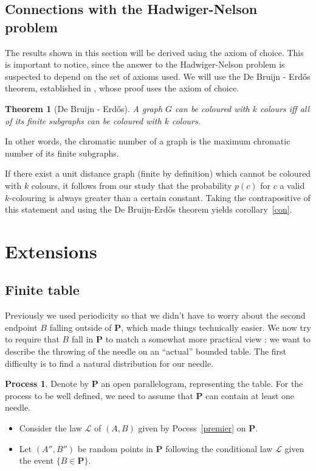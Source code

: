\documentclass[a4paper,11pt]{article}
\newtheorem{theo}{Theorem}
\theoremstyle{definition}
\newtheorem{process}{Process}
\theoremstyle{remark}
\renewcommand{\P}{\mathbf{P}}
\begin{document}
\subsection{Connections with the Hadwiger-Nelson problem} \label{hn}
The results shown in this section will be derived using the axiom of choice. 
This is important to notice, since the answer to the Hadwiger-Nelson problem is 
suspected to depend on the set of axioms used. We will use the 
De Bruijn - Erd\H{o}s theorem, established in \cite{erdos}, whose proof uses 
the axiom of choice.
\begin{theo}[De Bruijn - Erdős]
 A graph $G$ can be coloured with $k$ colours iff all of its finite subgraphs 
 can be coloured with $k$ colours.
\end{theo}
In other words, the chromatic number of a graph is the maximum chromatic number 
of its finite subgraphs.

If there exist a unit distance graph (finite by definition) which cannot 
be coloured with $k$ colours, it 
follows from our study that the probability $p(c)$ for $c$ a valid 
$k$-colouring is always greater than a certain constant. Taking the 
contrapositive of this statement and using the De Bruijn-Erdős theorem yields 
corollary~\ref{con}.

\section{Extensions}
\label{ext}
\subsection{Finite table}
\label{fini}

Previously we used periodicity so that we didn't have to worry about the second 
endpoint $B$ falling outside of $\mathbf{P}$, which made things technically easier. We now 
try to require that $B$ fall in $\mathbf{P}$ to match a somewhat more practical 
view : we want to describe the throwing of the needle on an ``actual'' bounded 
table. The first difficulty is to find a natural distribution for our needle.

\begin{process} \label{encore}
Denote by $\mathbf{P}$ an open parallelogram, representing the table. For the 
process to be well defined, we need to assume that $\mathbf{P}$ can contain at
least one needle.
\begin{itemize}
\item Consider the law $\mathcal{L}$ of $(A,B)$ given by Pocess~\ref{premier} on $\P$.
\item Let $(A'',B'')$ be random points in $\P$ following the conditional law
$\mathcal{L}$ given the event $\{B \in \mathbf{P} \}$.
\end{itemize}
\end{process}
\end{document}
